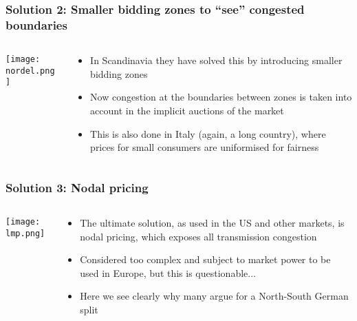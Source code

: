 \documentclass[10pt,aspectratio=169,dvipsnames]{beamer}
\let\olditem\item
\renewcommand{\item}{%
\olditem\vspace{5pt}}
\begin{document}
\begin{frame}
  \frametitle{Solution 2: Smaller bidding zones to ``see'' congested boundaries}


\begin{columns}[T]
  \begin{column}{5cm}
\texttt{[image: nordel.png]}
  \end{column}
  \begin{column}{5cm}
    \begin{itemize}
      \item In Scandinavia they have solved this by introducing \alert{smaller bidding zones}
      \item Now congestion at the boundaries between zones is taken
        into account in the \alert{implicit auctions} of the market
      \item This is also done in Italy (again, a long country),
          where prices for small consumers are \alert{uniformised} for fairness
    \end{itemize}

\end{column}
\end{columns}


\end{frame}



\begin{frame}
  \frametitle{Solution 3: Nodal pricing}


\begin{columns}[T]
  \begin{column}{6cm}

    \vspace{.5cm}
\texttt{[image: lmp.png]}
  \end{column}
  \begin{column}{5cm}
    \begin{itemize}
    \item The ultimate solution, as used in the US and other markets,
      is \alert{nodal pricing}, which exposes all transmission congestion
    \item Considered too complex and subject to market power to be
      used in Europe, but this is questionable...
      \item Here we see clearly why many argue for a North-South
        German split
    \end{itemize}

\end{column}
\end{columns}



\end{frame}
\end{document}
